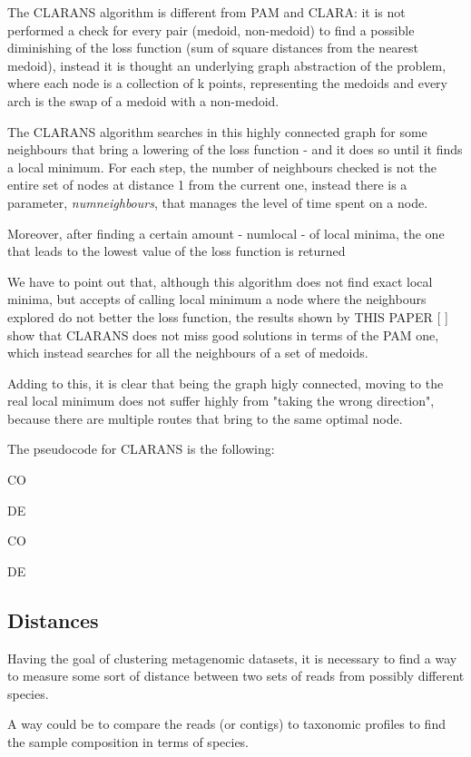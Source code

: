 The CLARANS algorithm is different from PAM and CLARA: it is not performed a check for every pair (medoid, non-medoid) to find a possible diminishing of the loss function (sum of square distances from the nearest medoid), instead it is thought an underlying graph abstraction of the problem, where each node is a collection of k points, representing the medoids and every arch is the swap of a medoid with a non-medoid.

The CLARANS algorithm searches in this highly connected graph for some neighbours that bring a lowering of the loss function - and it does so until it finds a local minimum. For each step, the number of neighbours checked is not the entire set of nodes at distance 1 from the current one, instead there is a parameter, \textit{numneighbours}, that manages the level of time spent on a node.

Moreover, after finding a certain amount - numlocal - of local minima, the one that leads to the lowest value of the loss function is returned

We have to point out that, although this algorithm does not find exact local minima, but accepts of calling local minimum a node where the neighbours explored do not better the loss function, the results shown by THIS PAPER [
] show that CLARANS does not miss good solutions in terms of the PAM one, which instead searches for all the neighbours of a set of medoids.

Adding to this, it is clear that being the graph higly connected, moving to the real local minimum does not suffer highly from "taking the wrong direction", because there are multiple routes that bring to the same optimal node.

The pseudocode for CLARANS is the following:

CO

DE

CO

DE


\cite{CLARANS}
\subsection{Distances}
Having the goal of clustering metagenomic datasets, it is necessary to find a way to measure some sort of distance between two sets of reads from possibly different species.

A way could be to compare the reads (or contigs) to taxonomic profiles to find the sample composition in terms of species.

